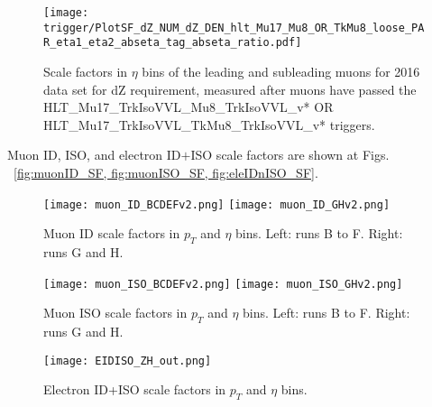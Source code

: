 \begin{figure}
\centering
\texttt{[image: trigger/PlotSF\_dZ\_NUM\_dZ\_DEN\_hlt\_Mu17\_Mu8\_OR\_TkMu8\_loose\_PAR\_eta1\_eta2\_abseta\_tag\_abseta\_ratio.pdf]}
\caption{Scale factors in $\eta$ bins of the leading and subleading muons for 2016 data set for dZ requirement, measured after muons have passed the HLT\_Mu17\_TrkIsoVVL\_Mu8\_TrkIsoVVL\_v* OR HLT\_Mu17\_TrkIsoVVL\_TkMu8\_TrkIsoVVL\_v* triggers. }
\label{fig:trigger_SF_dimu_dZ_H}
\end{figure}


Muon ID, ISO, and electron ID$+$ISO scale factors are shown at Figs. ~\ref{fig:muonID_SF, fig:muonISO_SF, fig:eleIDnISO_SF}.
\begin{figure}
\centering
\texttt{[image: muon\_ID\_BCDEFv2.png]}
\bigbreak
\texttt{[image: muon\_ID\_GHv2.png]}
\caption{ Muon ID scale factors in $p_{T}$ and $\eta$ bins. Left: runs B to F. Right: runs G and H.}
\label{fig:muonID_SF}
\end{figure}


\begin{figure}
\centering
\texttt{[image: muon\_ISO\_BCDEFv2.png]}
\bigbreak
\texttt{[image: muon\_ISO\_GHv2.png]}
\caption{ Muon ISO scale factors in $p_{T}$ and $\eta$ bins. Left: runs B to F. Right: runs G and H.}
\label{fig:muonISO_SF}
\end{figure}

\begin{figure}
\centering
\texttt{[image: EIDISO\_ZH\_out.png]}
\caption{ Electron ID+ISO scale factors in $p_{T}$ and $\eta$ bins.}
\label{fig:eleIDnISO_SF}
\end{figure}

